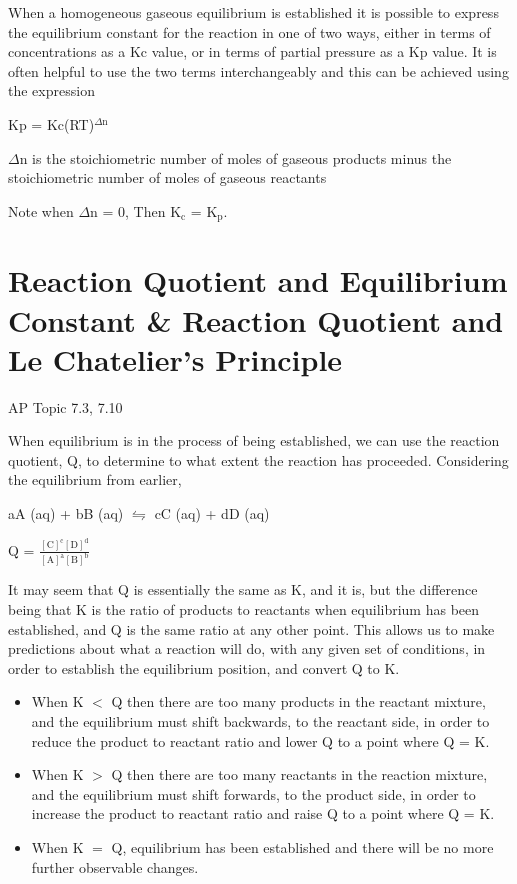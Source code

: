 \documentclass[../chem.tex]{subfiles}
\begin{document}
When a homogeneous gaseous equilibrium is established it is possible to express the equilibrium constant for the reaction in one of two ways, either in terms 
of concentrations as a Kc value, or in terms of partial pressure as a Kp value. It is often helpful to use the two terms interchangeably and this can 
be achieved using the expression
\begin{center}
    Kp = Kc(RT)$^{\Delta{\text{n}}}$
\end{center}
$\Delta$n is the stoichiometric number of moles of gaseous products minus the stoichiometric number of moles of gaseous reactants

Note when $\Delta$n = 0, Then K$_{\text{c}}$ = K$_{\text{p}}$. 
\section{Reaction Quotient and Equilibrium Constant \& Reaction Quotient and Le Chatelier's Principle}
AP Topic 7.3, 7.10

When equilibrium is in the process of being established, we can use the reaction quotient, Q, to determine to what extent the reaction has proceeded.
Considering the equilibrium from earlier,
\begin{center}
    aA (aq) + bB (aq) $\leftrightharpoons$ cC (aq) + dD (aq)
\end{center}
\begin{center}
    Q = $\frac{[\text{C}]^{\text{c}}[\text{D}]^{\text{d}}}{[\text{A}]^{\text{a}}[\text{B}]^{\text{b}}}$
\end{center}

It may seem that Q is essentially the same as K, and it is, but the difference being that K is the ratio of products to reactants when equilibrium 
has been established, and Q is the same ratio at any other point. This allows us to make predictions about what a reaction will do, with any given 
set of conditions, in order to establish the equilibrium position, and convert Q to K. 
\begin{itemize}
    \item When K $<$ Q then there are too many products in the reactant mixture, and the equilibrium must shift backwards, to the reactant side, in order to reduce the product to reactant ratio and lower Q to a point where Q = K.
    \item When K $>$ Q then there are too many reactants in the reaction mixture, and the equilibrium must shift forwards, to the product side, in order to increase the product to reactant ratio and raise Q to a point where Q = K.
    \item When K $=$ Q, equilibrium has been established and there will be no more further observable changes.
\end{itemize}
\end{document}
